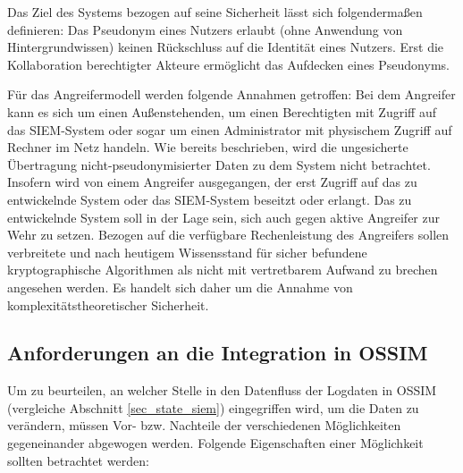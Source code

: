 Das Ziel des Systems bezogen auf seine Sicherheit lässt sich folgendermaßen definieren: Das Pseudonym eines Nutzers erlaubt (ohne Anwendung von Hintergrundwissen) keinen Rückschluss auf die Identität eines Nutzers. Erst die Kollaboration berechtigter Akteure ermöglicht das Aufdecken eines Pseudonyms.

Für das Angreifermodell werden folgende Annahmen getroffen: Bei dem Angreifer kann es sich um einen Außenstehenden, um einen Berechtigten mit Zugriff auf das SIEM-System oder sogar um einen Administrator mit physischem Zugriff auf Rechner im Netz handeln. Wie bereits beschrieben, wird die ungesicherte Übertragung nicht-pseudonymisierter Daten zu dem System nicht betrachtet. Insofern wird von einem Angreifer ausgegangen, der erst Zugriff auf das zu entwickelnde System oder das SIEM-System beseitzt oder erlangt. Das zu entwickelnde System soll in der Lage sein, sich auch gegen aktive Angreifer zur Wehr zu setzen. 
Bezogen auf die verfügbare Rechenleistung des Angreifers sollen verbreitete und nach heutigem Wissensstand für sicher befundene kryptographische Algorithmen als nicht mit vertretbarem Aufwand zu brechen angesehen werden. Es handelt sich daher um die Annahme von komplexitätstheoretischer Sicherheit.


\subsection*{Anforderungen an die Integration in OSSIM}

Um zu beurteilen, an welcher Stelle in den Datenfluss der Logdaten in OSSIM (vergleiche Abschnitt \ref{sec_state_siem}) eingegriffen wird, um die Daten zu verändern, müssen Vor- bzw. Nachteile der verschiedenen Möglichkeiten gegeneinander abgewogen werden. Folgende Eigenschaften einer Möglichkeit sollten betrachtet werden:

